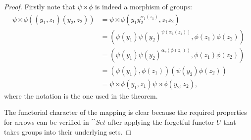 \begin{proof}
    Firstly note that $\psi\rtimes\phi$ is indeed a morphism of groups:
    \begin{align*}
        \psi\rtimes\phi((y_1,z_1)(y_2,z_2))
            &= \psi\rtimes\phi(y_1y_2^{\alpha_1(z_1)},z_1z_2)\\
            &= (\psi(y_1)\psi(y_2)^{\psi(\alpha_1(z_1))},\phi(z_1)\phi(z_2))\\
            &= (\psi(y_1)\psi(y_2)^{\alpha_2(\phi(z_1))},\phi(z_1)\phi(z_2))\\
            &= (\psi(y_1),\phi(z_1))(\psi(y_2)\phi(z_2))\\
            &=  \psi\rtimes\phi(y_1,z_1)\psi\rtimes\phi(y_2,z_2),
    \end{align*}
    where the notation is the one used in the theorem.

    The functorial character of the mapping is clear because the required properties for arrows can be verified in $\cat{Set}$ after applying the forgetful functor $U$ that takes groups into their underlying sets.


\end{proof}
